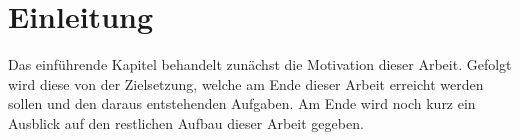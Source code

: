\chapter{Einleitung}

Das einführende Kapitel behandelt zunächst die Motivation dieser Arbeit. Gefolgt wird diese von der Zielsetzung, welche am Ende dieser Arbeit erreicht werden sollen und den daraus entstehenden Aufgaben. Am Ende wird noch kurz ein Ausblick auf den restlichen Aufbau dieser Arbeit gegeben.





